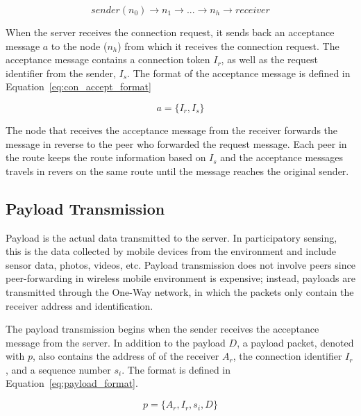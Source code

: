 \begin{equation}
sender(n_0) \rightarrow n_1 \rightarrow ... \rightarrow n_h
\rightarrow receiver
\end{equation}

When the server receives the connection request, it sends back an
acceptance message $a$ to the node ($n_h$) from which it receives
the connection request. The acceptance message contains a
connection token $I_r$, as well as the request identifier from the
sender, $I_s$. The format of the acceptance message is defined in
Equation~\ref{eq:con_accept_format}

\begin{equation}\label{eq:con_accept_format}
a = \{I_r, I_s\}
\end{equation}

The node that receives the acceptance message from the receiver
forwards the message in reverse to the peer who forwarded the
request message. Each peer in the route keeps the route
information based on $I_s$ and the acceptance messages travels in
revers on the same route until the message reaches the original
sender.



\subsection{Payload Transmission}

Payload is the actual data transmitted to the server. In
participatory sensing, this is the data collected by mobile
devices from the environment and include sensor data, photos,
videos, etc. Payload transmission does not involve peers since
peer-forwarding in wireless mobile environment is expensive;
instead, payloads are transmitted through the One-Way network, in
which the packets only contain the receiver address and
identification.

The payload transmission begins when the sender receives the
acceptance message from the server. In addition to the payload
$D$, a payload packet, denoted with $p$, also contains the address
of of the receiver $A_r$, the connection identifier $I_r$, and a
sequence number $s_i$. The format is defined in
Equation~\ref{eq:payload_format}.

\begin{equation}\label{eq:payload_format}
p = \{A_r, I_r, s_i, D\}
\end{equation}

